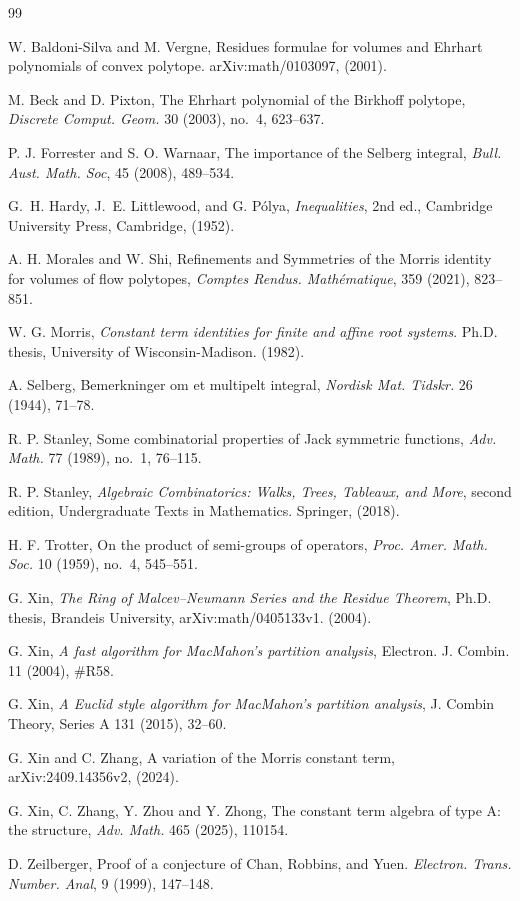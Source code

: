 \documentclass[reqno, 12pt]{article}
\numberwithin{equation}{section}
\theoremstyle{definition}
\begin{document}
\begin{thebibliography}{99}
    
 W. Baldoni-Silva and M. Vergne, Residues formulae for volumes and Ehrhart polynomials of convex polytope.	arXiv:math/0103097, (2001).
    
 M. Beck and D. Pixton, The Ehrhart polynomial of the Birkhoff polytope, \emph{Discrete Comput. Geom.} 30 (2003), no.~4, 623--637.

 P. J. Forrester and S. O. Warnaar, The importance of the Selberg integral, \emph{Bull. Aust. Math. Soc}, 45 (2008), 489--534.

 G.~H. Hardy, J.~E. Littlewood, and G. P\'olya, \emph{Inequalities}, 2nd ed., Cambridge University Press, Cambridge, (1952).

 A. H. Morales and W. Shi, Refinements and Symmetries of the Morris identity for volumes of flow polytopes, \emph{Comptes Rendus. Math\'ematique}, 359 (2021), 823--851.

 W. G. Morris, \emph{Constant term identities for finite and affine root systems}. Ph.D. thesis, University of Wisconsin-Madison. (1982).

 A. Selberg, Bemerkninger om et multipelt integral, \emph{Nordisk Mat. Tidskr.} 26 (1944), 71--78.


 R. P. Stanley, Some combinatorial properties of Jack symmetric functions, \emph{Adv. Math.} 77 (1989), no.~1, 76--115.

 R. P. Stanley, \emph{Algebraic Combinatorics: Walks, Trees, Tableaux, and More}, second edition, Undergraduate Texts in Mathematics. Springer, (2018).

 H. F. Trotter, On the product of semi-groups of operators, \emph{Proc. Amer. Math. Soc.} 10 (1959), no.~4, 545--551.

 G. Xin, \emph{The Ring of Malcev--Neumann Series and the Residue Theorem}, Ph.D. thesis, Brandeis University, arXiv:math/0405133v1. (2004).

 G. Xin, \emph{A fast algorithm for MacMahon's partition analysis}, Electron. J. Combin. 11 (2004), \#R58.

 G. Xin, \emph{A Euclid style algorithm for MacMahon's partition analysis}, J. Combin Theory, Series A 131 (2015), 32--60.

 G. Xin and C. Zhang, A variation of the Morris constant term, arXiv:2409.14356v2, (2024).

 G. Xin, C. Zhang, Y. Zhou and Y. Zhong, The constant term algebra of type A: the structure, \emph{Adv. Math.} 465 (2025), 110154.

 D. Zeilberger, Proof of a conjecture of Chan, Robbins, and Yuen. \emph{Electron. Trans. Number. Anal}, 9 (1999), 147--148.


\end{thebibliography}
\end{document}
